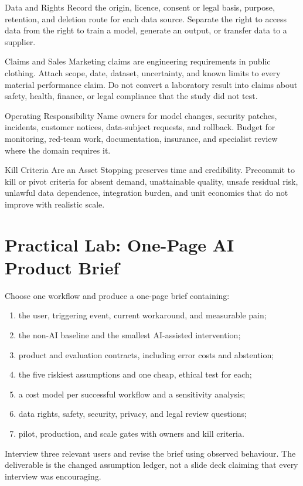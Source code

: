 \begin{v3topic}{Data and Rights}
Record the origin, licence, consent or legal basis, purpose, retention, and
deletion route for each data source.
Separate the right to access data from the right to train a model, generate an
output, or transfer data to a supplier.

\end{v3topic}
\begin{v3topic}{Claims and Sales}
Marketing claims are engineering requirements in public clothing.
Attach scope, date, dataset, uncertainty, and known limits to every material
performance claim.
Do not convert a laboratory result into claims about safety, health, finance,
or legal compliance that the study did not test.

\end{v3topic}
\begin{v3topic}{Operating Responsibility}
Name owners for model changes, security patches, incidents, customer notices,
data-subject requests, and rollback.
Budget for monitoring, red-team work, documentation, insurance, and specialist
review where the domain requires it.

\end{v3topic}
\begin{v3topic}{Kill Criteria Are an Asset}
Stopping preserves time and credibility.
Precommit to kill or pivot criteria for absent demand, unattainable quality,
unsafe residual risk, unlawful data dependence, integration burden, and unit
economics that do not improve with realistic scale.
\end{v3topic}

\section{Practical Lab: One-Page AI Product Brief}

\begin{practicallab}
Choose one workflow and produce a one-page brief containing:
\begin{enumerate}
    \item the user, triggering event, current workaround, and measurable pain;
    \item the non-AI baseline and the smallest AI-assisted intervention;
    \item product and evaluation contracts, including error costs and
          abstention;
    \item the five riskiest assumptions and one cheap, ethical test for each;
    \item a cost model per successful workflow and a sensitivity analysis;
    \item data rights, safety, security, privacy, and legal review questions;
    \item pilot, production, and scale gates with owners and kill criteria.
\end{enumerate}
Interview three relevant users and revise the brief using observed behaviour.
The deliverable is the changed assumption ledger, not a slide deck claiming
that every interview was encouraging.
\end{practicallab}

